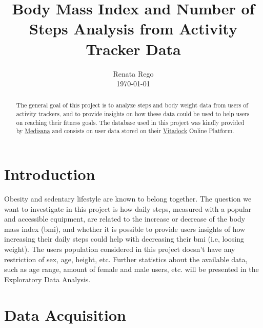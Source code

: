 \documentclass[11pt]{iopart}
\begin{document}
\title[]{Body Mass Index and Number of Steps Analysis from Activity Tracker Data}

\author{Renata Rego \\ \today} %

\begin{abstract}
The general goal of this project is to analyze steps and body weight data from users of activity trackers, and to provide insights on how these data could be used to help users on reaching their fitness goals.
The database used in this project was kindly provided by \href{http://www.medisana.de/}{Medisana\textregistered} and consists on user data stored on their 
\href{https://cloud.vitadock.com/}{Vitadock} Online Platform.

\end{abstract}

\section{Introduction}

Obesity and sedentary lifestyle are known to belong together. The question we want to  investigate in this project is how daily steps, measured with a popular and accessible equipment, are related to the increase or decrease of the body mass index (bmi), and whether it is possible to provide users insights of how increasing their daily steps could help with decreasing their bmi (i.e, loosing weight). The users population considered in this project doesn't have any restriction of  sex, age, height, etc. Further statistics about the available data, such as age range, amount of female and male users, etc. will be presented in the Exploratory Data Analysis.


\section{Data Acquisition}
\end{document}
